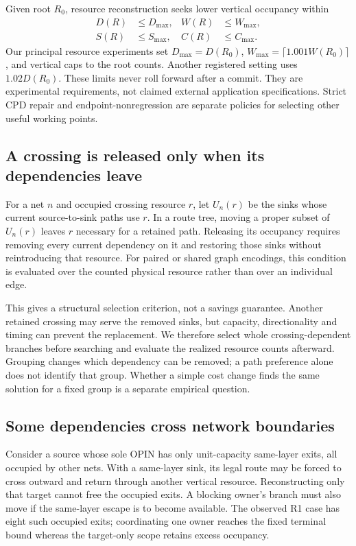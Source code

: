 \documentclass[conference,10pt]{IEEEtran}
\begin{document}
Given root $R_0$, resource reconstruction seeks lower vertical occupancy within
\begin{equation}
 \begin{aligned}
 D(R)&\le D_{\max}, & W(R)&\le W_{\max},\\
 S(R)&\le S_{\max}, & C(R)&\le C_{\max}.
 \end{aligned}
\label{eq:budget}
\end{equation}
Our principal resource experiments set $D_{\max}=D(R_0)$, $W_{\max}=\lceil1.001W(R_0)\rceil$, and vertical caps to the root counts. Another registered setting uses $1.02D(R_0)$. These limits never roll forward after a commit. They are experimental requirements, not claimed external application specifications. Strict CPD repair and endpoint-nonregression are separate policies for selecting other useful working points.

\subsection{A crossing is released only when its dependencies leave}
For a net $n$ and occupied crossing resource $r$, let $U_n(r)$ be the sinks whose current source-to-sink paths use $r$. In a route tree, moving a proper subset of $U_n(r)$ leaves $r$ necessary for a retained path. Releasing its occupancy requires removing every current dependency on it and restoring those sinks without reintroducing that resource. For paired or shared graph encodings, this condition is evaluated over the counted physical resource rather than over an individual edge.

This gives a structural selection criterion, not a savings guarantee. Another retained crossing may serve the removed sinks, but capacity, directionality and timing can prevent the replacement. We therefore select whole crossing-dependent branches before searching and evaluate the realized resource counts afterward. Grouping changes which dependency can be removed; a path preference alone does not identify that group. Whether a simple cost change finds the same solution for a fixed group is a separate empirical question.

\subsection{Some dependencies cross network boundaries}
Consider a source whose sole OPIN has only unit-capacity same-layer exits, all occupied by other nets. With a same-layer sink, its legal route may be forced to cross outward and return through another vertical resource. Reconstructing only that target cannot free the occupied exits. A blocking owner's branch must also move if the same-layer escape is to become available. The observed R1 case has eight such occupied exits; coordinating one owner reaches the fixed terminal bound whereas the target-only scope retains excess occupancy.
\end{document}
